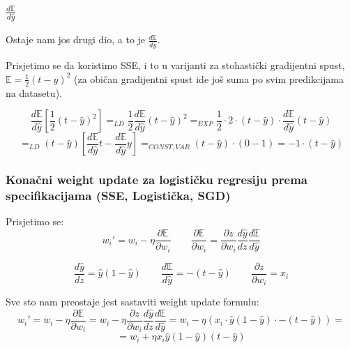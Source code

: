 \documentclass{beamer}
\begin{document}
\begin{frame}
\frametitle{$\frac{d\mathbb{E}}{d\hat{y}}$}
Ostaje nam jos drugi dio, a to je $\frac{d\mathbb{E}}{d\hat{y}}$.\pause

Prisjetimo se da koristimo SSE, i to u varijanti za stohasti\v cki gradijentni spust, $\mathbb{E}=\frac{1}{2}(t-y)^2$ (za obi\v can gradijentni spust ide jo\v s suma po svim predikcijama na datasetu).\pause

$$\frac{d\mathbb{E}}{d\hat{y}} [\frac{1}{2}(t-\hat{y})^2] =_{LD}  \frac{1}{2}\frac{d\mathbb{E}}{d\hat{y}}(t-\hat{y})^2 =_{EXP} \frac{1}{2}\cdot 2 \cdot (t-\hat{y}) \cdot \frac{d\mathbb{E}}{d\hat{y}}(t-\hat{y})$$ 
$$=_{LD} (t-\hat{y}) [\frac{d\mathbb{E}}{d\hat{y}}t - \frac{d\mathbb{E}}{d\hat{y}}y] =_{CONST,VAR} (t-\hat{y}) \cdot (0-1)= -1\cdot (t-\hat{y})  $$


\end{frame}

\begin{frame}
\frametitle{Kona\v cni weight update za logisti\v cku regresiju prema specifikacijama (SSE, Logisti\v cka, SGD)}
Prisjetimo se:
$$w_i'=w_i-\eta\frac{\partial\mathbb{E}}{\partial w_i} \qquad \frac{\partial \mathbb{E}}{\partial w_i}= \frac{\partial z}{\partial w_i} \frac{d \hat{y}}{d z} \frac{d \mathbb{E}}{d\hat{y}}$$\pause


$$\frac{d\hat{y}}{dz}=\hat{y}(1-\hat{y}) \qquad \frac{d\mathbb{E}}{d\hat{y}}=-(t-\hat{y}) \qquad \frac{\partial z}{\partial w_i}=x_i$$\pause

Sve sto nam preostaje jest sastaviti weight update formulu:
$$w_i'=w_i-\eta\frac{\partial \mathbb{E}}{\partial w_i}= w_i -\eta\frac{\partial z}{\partial w_i} \frac{d \hat{y}}{d z} \frac{d \mathbb{E}}{d\hat{y}}= w_i-\eta (x_i \cdot \hat{y}(1-\hat{y})\cdot -(t-\hat{y}))=$$
$$=w_i+\eta x_i \hat{y} (1-\hat{y})(t-\hat{y})$$

\end{frame}
\end{document}
